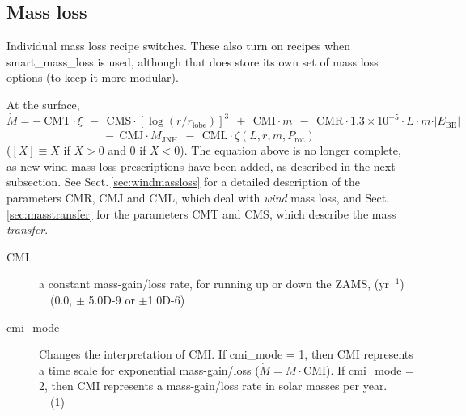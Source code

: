 \subsection{Mass loss}
\label{sec:initdat:massloss}

Individual mass loss recipe switches.  These also turn on recipes when smart\_mass\_loss is used, although that does store its own set of mass loss options (to keep it more modular).

At the surface, 
$$ \dot{M} = -~\mathrm{CMT} \cdot \xi ~~-~~ \mathrm{CMS} \cdot \left[ \log (r/ r_\mathrm{lobe})\right]^3
~~+~~ \mathrm{CMI} \cdot m ~~-~~ \mathrm{CMR} \cdot 1.3 \times 10^{-5}\cdot L\cdot m \cdot \vert E_\mathrm{BE}\vert $$
$$-~~ \mathrm{CMJ} \cdot \dot{M}_\mathrm{JNH} ~~-~~ \mathrm{CML} \cdot \zeta (L, r, m, P_\mathrm{rot}) $$
($\left[X\right] \equiv X$ if $X>0$ and 0 if $X<0$).  The equation above is no longer complete, as new wind mass-loss prescriptions
have been added, as described in the next subsection.
See Sect.\,\ref{sec:windmassloss} for a detailed description of the parameters CMR, CMJ and CML, which deal with \emph{wind} 
mass loss, and Sect.\,\ref{sec:masstransfer} for the parameters CMT and CMS, which describe the mass \emph{transfer}.

\begin{description}
\item[CMI]\hypertarget{cmi}{} a constant mass-gain/loss rate, for running up or down the ZAMS, (yr$^{-1}$)  \ \ (0.0, $\pm$ 5.0D-9 or $\pm$1.0D-6)
\item[cmi\_mode]\hypertarget{cmi_mode}{} Changes the interpretation of CMI. If cmi\_mode = 1, then CMI represents a time scale for exponential mass-gain/loss ($\dot{M} = M \cdot \mathrm{CMI}$). If cmi\_mode = 2, then CMI represents a mass-gain/loss rate in solar masses per year. \ \  (1)
\end{description}

